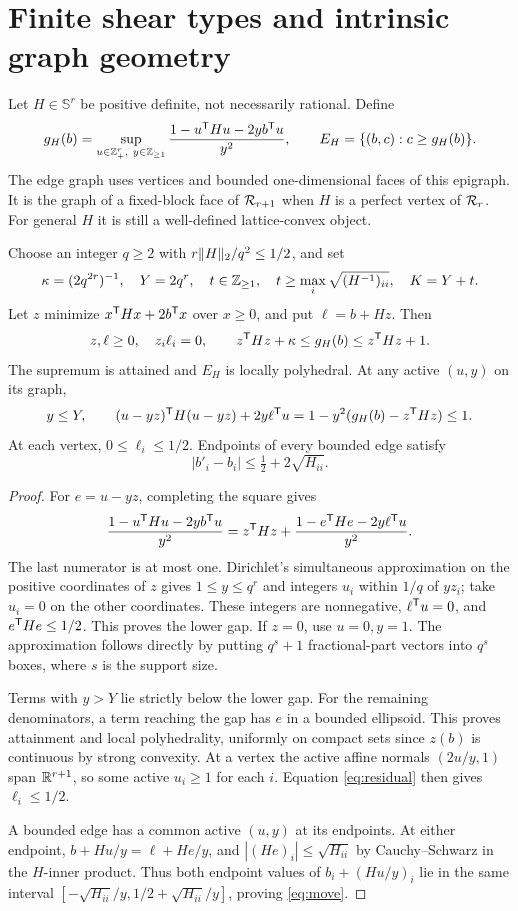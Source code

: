 \section{Finite shear types and intrinsic graph geometry}
Let $H\in\mathbb S^r$ be positive definite, not necessarily rational. Define
\[
 g_H(b)=\sup_{u\in\mathbb Z_+^r,\ y\in\mathbb Z_{\ge1}}
 \frac{1-u^{\mathsf T} Hu-2yb^{\mathsf T} u}{y^2},\qquad
 E_H=\{(b,c):c\ge g_H(b)\}.
\]
The edge graph uses vertices and bounded one-dimensional faces of this epigraph. It is the graph of a fixed-block face of $\mathcal R_{r+1}$ when $H$ is a perfect vertex of $\mathcal R_r$. For general $H$ it is still a well-defined lattice-convex object.

\begin{lemma}\label{lem:gap}
Choose an integer $q\ge2$ with $r\lVert H\rVert_2/q^2\le1/2$, and set
\[
 \kappa=(2q^{2r})^{-1},\quad Y=2q^r,\quad
 t\in\mathbb Z_{\ge1},\quad t\ge\max_i\sqrt{(H^{-1})_{ii}},\quad K=Y+t.
\]
Let $z$ minimize $x^{\mathsf T} Hx+2b^{\mathsf T} x$ over $x\ge0$, and put $\ell=b+Hz$. Then
\[
 z,\ell\ge0,\quad z_i\ell_i=0,\qquad
 z^{\mathsf T} Hz+\kappa\le g_H(b)\le z^{\mathsf T} Hz+1.
\]
The supremum is attained and $E_H$ is locally polyhedral. At any active $(u,y)$ on its graph,
\begin{equation}\label{eq:residual}
 y\le Y,\qquad (u-yz)^{\mathsf T} H(u-yz)+2y\ell^{\mathsf T} u
 =1-y^2(g_H(b)-z^{\mathsf T} Hz)\le1.
\end{equation}
At each vertex, $0\le\ell_i\le1/2$. Endpoints of every bounded edge satisfy
\begin{equation}\label{eq:move}
 |b'_i-b_i|\le\tfrac12+2\sqrt{H_{ii}}.
\end{equation}
\end{lemma}
\begin{proof}
For $e=u-yz$, completing the square gives
\[
 \frac{1-u^{\mathsf T} Hu-2yb^{\mathsf T} u}{y^2}
 =z^{\mathsf T} Hz+\frac{1-e^{\mathsf T} He-2y\ell^{\mathsf T} u}{y^2}.
\]
The last numerator is at most one. Dirichlet's simultaneous approximation on the positive coordinates of $z$ gives $1\le y\le q^r$ and integers $u_i$ within $1/q$ of $yz_i$; take $u_i=0$ on the other coordinates. These integers are nonnegative, $\ell^{\mathsf T} u=0$, and $e^{\mathsf T} He\le1/2$. This proves the lower gap. If $z=0$, use $u=0,y=1$. The approximation follows directly by putting $q^s+1$ fractional-part vectors into $q^s$ boxes, where $s$ is the support size.

Terms with $y>Y$ lie strictly below the lower gap. For the remaining denominators, a term reaching the gap has $e$ in a bounded ellipsoid. This proves attainment and local polyhedrality, uniformly on compact sets since $z(b)$ is continuous by strong convexity. At a vertex the active affine normals $(2u/y,1)$ span $\mathbb R^{r+1}$, so some active $u_i\ge1$ for each $i$. Equation \eqref{eq:residual} then gives $\ell_i\le1/2$.

A bounded edge has a common active $(u,y)$ at its endpoints. At either endpoint,
$b+Hu/y=\ell+He/y$, and $|(He)_i|\le\sqrt{H_{ii}}$ by Cauchy--Schwarz in the $H$-inner product. Thus both endpoint values of $b_i+(Hu/y)_i$ lie in the same interval $[-\sqrt{H_{ii}}/y,1/2+\sqrt{H_{ii}}/y]$, proving \eqref{eq:move}.
\end{proof}

